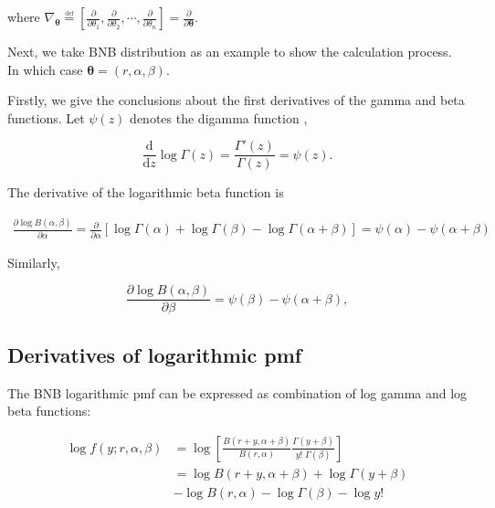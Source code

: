 \documentclass[11pt]{article}
\begin{document}
where $ \nabla_{\boldsymbol{\theta}}{\overset{\underset {\mathrm{def} }{}}{=}}\left[{\frac{\partial }{\partial \theta_{1}}},{\frac{\partial }{\partial \theta_{2}}},\cdots ,{\frac{\partial }{\partial \theta_{n}}}\right]={\frac{\partial }{\partial {\boldsymbol{\theta}}}}.$



Next, we take BNB distribution as an example to show the calculation process. In which case $\boldsymbol {\theta}=(r,\alpha,\beta)$.

Firstly, we give the conclusions about the first derivatives of the gamma and beta functions. Let $\psi(z)$ denotes the digamma function \citep[Ch.~5]{olver2010nist},

\begin{equation}
{\frac {\mathrm {d} }{\mathrm {d} z}}\log \Gamma (z) = {\frac {\Gamma '(z)}{\Gamma (z)}} =\psi (z).
\end{equation}

The derivative of the logarithmic beta function is

\begin{equation}
  \begin{aligned}
  \frac{\partial \log B(\alpha,\beta)}{\partial \alpha} = \frac{\partial}{\partial \alpha}\left[ \log\Gamma(\alpha)+\log\Gamma(\beta)-\log\Gamma(\alpha+\beta) \right] = \psi(\alpha) - \psi(\alpha+\beta)
  \end{aligned}
\end{equation}

Similarly,

\begin{equation}
  \frac{\partial \log B(\alpha,\beta)}{\partial \beta} = \psi(\beta) - \psi(\alpha+\beta),
\end{equation}


\subsection*{Derivatives of logarithmic pmf}

 The BNB logarithmic pmf can be expressed as combination of log gamma and log beta functions:

\begin{equation}
\begin{aligned}
	\log f(y;r, \alpha ,\beta) &= \log\left[ \frac {B (r+y,\alpha +\beta )}{B (r,\alpha )} \frac {\Gamma (y+\beta )}{y!\;\Gamma (\beta )} \right] \\
	&= \log B (r+y,\alpha +\beta ) + \log \Gamma (y+\beta ) \\
	&- \log B (r,\alpha ) - \log \Gamma (\beta ) - \log y!
\end{aligned}
\end{equation}
\end{document}
